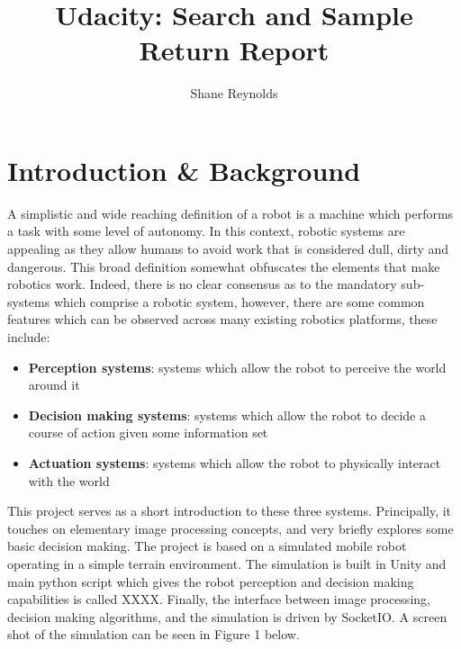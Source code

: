 \documentclass[a4paper]{article}
\begin{document}
\title{Udacity: Search and Sample Return Report}
\author{Shane Reynolds}
\maketitle
\section{Introduction \& Background}
A simplistic and wide reaching definition of a robot is a machine which performs a task with some level of autonomy. In this context, robotic systems are appealing as they allow humans to avoid work that is considered dull, dirty and dangerous. This broad definition somewhat obfuscates the elements that make robotics work. Indeed, there is no clear consensus as to the mandatory sub-systems which comprise a robotic system, however, there are some common features which can be observed across many existing robotics platforms, these include:
\begin{itemize}
\item \textbf{Perception systems}: systems which allow the robot to perceive the world around it
\item \textbf{Decision making systems}: systems which allow the robot to decide a course of action given some information set
\item \textbf{Actuation systems}: systems which allow the robot to physically interact with the world
\end{itemize}

This project serves as a short introduction to these three systems. Principally, it touches on elementary image processing concepts, and very briefly explores some basic decision making. The project is based on a simulated mobile robot operating in a simple terrain environment. The simulation is built in Unity and main python script which gives the robot perception and decision making capabilities is called XXXX. Finally, the interface between image processing, decision making algorithms, and the simulation is driven by SocketIO. A screen shot of the simulation can be seen in Figure 1 below.

\vspace{1cm}
\end{document}
